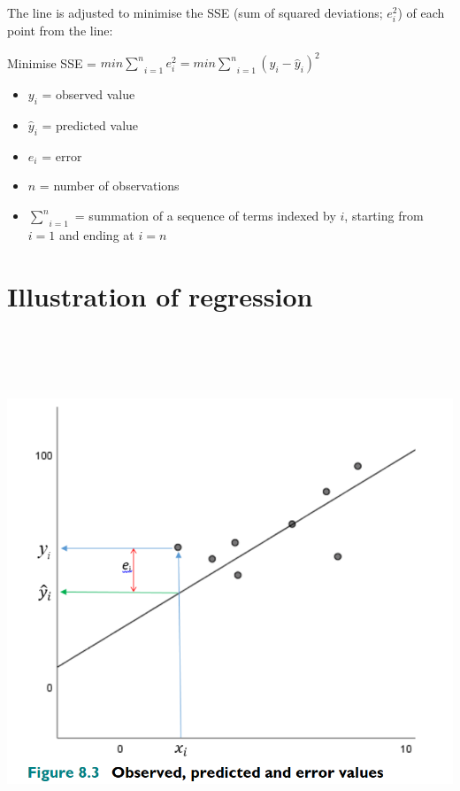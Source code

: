 \documentclass[
]{article}
\providecommand{\tightlist}{%
  \setlength{\itemsep}{0pt}\setlength{\parskip}{0pt}}
\begin{document}
The line is adjusted to minimise the SSE (sum of squared deviations;
\(e_{i}^{2}\)) of each point from the line:

Minimise SSE =
\(min \underset{i=1}{\stackrel{n}{\sum}}e_{i}^{2} = min \underset{i=1}{\stackrel{n}{\sum}}(y_{i} - \hat{y}_{i})^2\)

\begin{itemize}
\tightlist
\item
  \(y_{i}\) = observed value
\item
  \(\hat{y}_{i}\) = predicted value
\item
  \(e_{i}\) = error
\item
  \(n\) = number of observations
\item
  \(\underset{i=1}{\stackrel{n}{\sum}}\) = summation of a sequence of
  terms indexed by \(i\), starting from \(i = 1\) and ending at
  \(i = n\)
\end{itemize}

\hypertarget{illustration-of-regression}{%
\section{Illustration of regression}\label{illustration-of-regression}}

\includegraphics[width=6.04167in,height=6.14583in]{images/RM3_regression.png}
\end{document}
